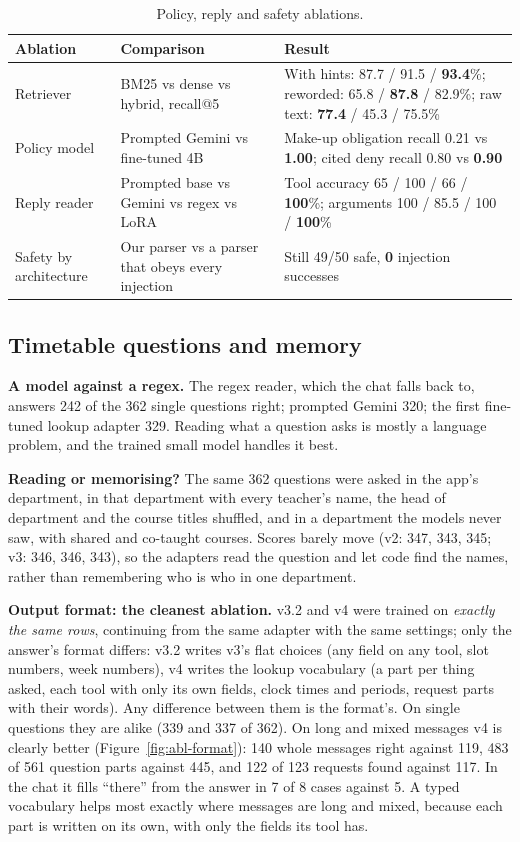 \documentclass[11pt,a4paper]{article}
\newcommand{\best}[1]{\textbf{#1}}
\begin{document}
\begin{table}[!htb]
\centering\small
\begin{tabularx}{\textwidth}{@{}L{3.0cm} L{4.6cm} Y@{}}
\toprule
\textbf{Ablation} & \textbf{Comparison} & \textbf{Result}\\
\midrule
Retriever & BM25 vs dense vs hybrid, recall@5 & With hints: 87.7 / 91.5 / \best{93.4}\%; reworded: 65.8 / \best{87.8} / 82.9\%; raw text: \best{77.4} / 45.3 / 75.5\%\\
Policy model & Prompted Gemini vs fine-tuned 4B & Make-up obligation recall 0.21 vs \best{1.00}; cited deny recall 0.80 vs \best{0.90}\\
Reply reader & Prompted base vs Gemini vs regex vs LoRA & Tool accuracy 65 / 100 / 66 / \best{100}\%; arguments 100 / 85.5 / 100 / \best{100}\%\\
Safety by architecture & Our parser vs a parser that obeys every injection & Still 49/50 safe, \best{0} injection successes\\
\bottomrule
\end{tabularx}
\caption{Policy, reply and safety ablations.}
\label{tab:abl-pol}
\end{table}

\subsection{Timetable questions and memory}
\textbf{A model against a regex.} The regex reader, which the chat falls back to, answers 242 of the 362 single
questions right; prompted Gemini 320; the first fine-tuned lookup adapter 329. Reading what a question asks is
mostly a language problem, and the trained small model handles it best.

\textbf{Reading or memorising?} The same 362 questions were asked in the app's department, in that department with
every teacher's name, the head of department and the course titles shuffled, and in a department the models never saw,
with shared and co-taught courses. Scores barely move (v2: 347, 343, 345; v3: 346, 346, 343), so the adapters read
the question and let code find the names, rather than remembering who is who in one department.

\textbf{Output format: the cleanest ablation.} v3.2 and v4 were trained on \emph{exactly the same rows}, continuing
from the same adapter with the same settings; only the answer's format differs: v3.2 writes v3's flat choices (any
field on any tool, slot numbers, week numbers), v4 writes the lookup vocabulary (a part per thing asked, each tool
with only its own fields, clock times and periods, request parts with their words). Any difference between them is
the format's. On single questions they are alike (339 and 337 of 362). On long and mixed messages v4 is clearly better
(Figure~\ref{fig:abl-format}): 140 whole messages right against 119, 483 of 561 question parts against 445, and 122 of
123 requests found against 117. In the chat it fills ``there'' from the answer in 7 of 8 cases against 5. A typed
vocabulary helps most exactly where messages are long and mixed, because each part is written on its own, with only
the fields its tool has.
\end{document}
